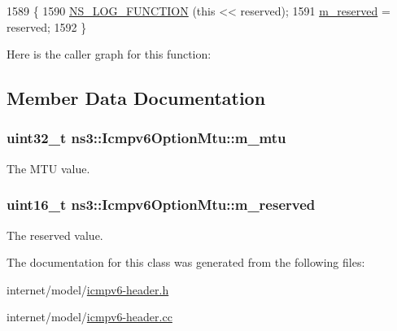 \begin{DoxyCode}
1589 \{
1590   \hyperlink{log-macros-disabled_8h_a90b90d5bad1f39cb1b64923ea94c0761}{NS\_LOG\_FUNCTION} (\textcolor{keyword}{this} << reserved);
1591   \hyperlink{classns3_1_1Icmpv6OptionMtu_a24531e6c44ae77e0137d3ec2e518f77c}{m\_reserved} = reserved;
1592 \}
\end{DoxyCode}


Here is the caller graph for this function\+:




\subsection{Member Data Documentation}
\subsubsection[{\texorpdfstring{m\+\_\+mtu}{m_mtu}}]{\setlength{\rightskip}{0pt plus 5cm}uint32\+\_\+t ns3\+::\+Icmpv6\+Option\+Mtu\+::m\+\_\+mtu\hspace{0.3cm}{\ttfamily [private]}}\hypertarget{classns3_1_1Icmpv6OptionMtu_a8a7272ad5ce3f1bb7236dd9a5c8695a9}{}\label{classns3_1_1Icmpv6OptionMtu_a8a7272ad5ce3f1bb7236dd9a5c8695a9}


The M\+TU value. 

\subsubsection[{\texorpdfstring{m\+\_\+reserved}{m_reserved}}]{\setlength{\rightskip}{0pt plus 5cm}uint16\+\_\+t ns3\+::\+Icmpv6\+Option\+Mtu\+::m\+\_\+reserved\hspace{0.3cm}{\ttfamily [private]}}\hypertarget{classns3_1_1Icmpv6OptionMtu_a24531e6c44ae77e0137d3ec2e518f77c}{}\label{classns3_1_1Icmpv6OptionMtu_a24531e6c44ae77e0137d3ec2e518f77c}


The reserved value. 



The documentation for this class was generated from the following files\+:\begin{DoxyCompactItemize}
\item 
internet/model/\hyperlink{icmpv6-header_8h}{icmpv6-\/header.\+h}\item 
internet/model/\hyperlink{icmpv6-header_8cc}{icmpv6-\/header.\+cc}\end{DoxyCompactItemize}
